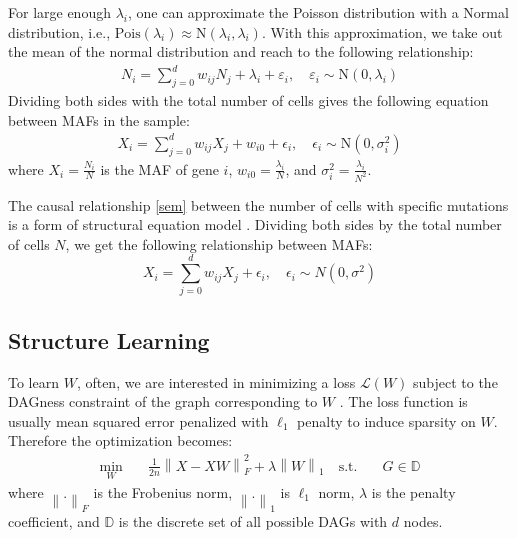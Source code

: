 \documentclass{bmcart}
\begin{document}
For large enough $\lambda_i$, one can approximate the Poisson distribution with a Normal distribution, i.e., $\text{Pois}(\lambda_i) \approx \text{N}(\lambda_i, \lambda_i)$.
With this approximation, we take out the mean of the normal distribution and reach to the following relationship: 
\begin{equation}
	\begin{aligned}
		N_i = \sum_{j=0}^{d} w_{ij} N_j + \lambda_i + \varepsilon_i, \quad \varepsilon_i \sim \text{N}(0, \lambda_i)
	\end{aligned} 
\end{equation} 
Dividing  both sides with the total number of cells gives the following equation between MAFs in the sample: 
\begin{equation}
	\begin{aligned}
		X_i = \sum_{j=0}^{d} w_{ij} X_j + w_{i0} + \epsilon_i, \quad \epsilon_i  \sim \text{N}(0, \sigma_i^2 )
	\end{aligned} 
\end{equation} 
where $X_i = \frac{N_i}{N}$ is the MAF of gene $i$, $w_{i0} = \frac{\lambda_i}{N}$, and $\sigma_i^2 = \frac{\lambda_i}{N^2}$.

The causal relationship \eqref{sem} between the number of cells with specific mutations is a form of structural equation model \cite{zheng2018dags}. Dividing both sides by the total number of cells $N$, we get the following relationship between MAFs:
\begin{equation}
	X_i = \sum_{j=0}^{d} w_{ij} X_j + \epsilon_i, \quad \epsilon_i \sim N(0, \sigma^2) 
\end{equation} 

\subsection{Structure Learning}
To learn $W$, often, we are interested in minimizing a loss $\mathcal{L}(W)$ subject to the DAGness constraint of the graph corresponding to $W$ . The loss function is usually mean squared error penalized with $\ell_1$ penalty to induce sparsity on $W$. Therefore the optimization becomes: 
\begin{equation}\label{dopt}
	\begin{aligned}
		\min_W & \quad  \frac{1}{2n} \left\lVert X - XW \right\rVert_F^2 + \lambda \left\lVert W \right\rVert_1 \quad
		\textrm{s.t.} & \quad G \in \mathbb{D}
	\end{aligned}
\end{equation}
where $\left\lVert.\right\rVert_F$ is the Frobenius norm, $\left\lVert.\right\rVert_1$ is $\ell_1$ norm, $\lambda$ is the penalty coefficient, and $\mathbb{D}$ is the discrete set of all possible DAGs with $d$ nodes.
\end{document}
